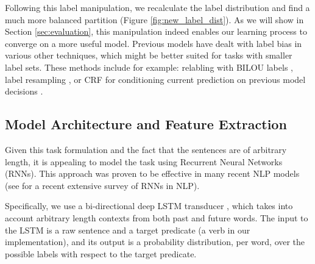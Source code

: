 
\begin{figure}[H]
\end{figure}


Following this label manipulation, we recalculate the label distribution and find
a much more balanced partition (Figure \ref{fig:new_label_dist}).
As we will show in Section \ref{sec:evaluation}, this manipulation indeed enables our learning process to
converge on a more useful model.
Previous models have dealt with label bias in various other techniques, which might be better suited
for tasks with smaller label sets. These methods include for example:
relabling with BILOU labels \cite{ratinov2009design},
label resampling \cite{estabrooks2004multiple},
or CRF for conditioning current prediction on previous model decisions \cite{baidusrl}.

\subsection{Model Architecture and Feature Extraction}
Given this task formulation and the fact that the sentences are of arbitrary length,
it is appealing to model the task using Recurrent Neural Networks (RNNs).
This approach was proven to be effective in many recent NLP models 
(see \cite{goldberg2015primer} for a recent extensive survey of RNNs in NLP).

Specifically, we use a bi-directional deep LSTM transducer \cite{graves2012sequence},
which takes into account arbitrary length contexts from both past and future words.
The input to the LSTM is a raw sentence and a target predicate (a verb in our implementation),
and its output is a probability distribution, per word, over the possible labels with respect to the target predicate.


